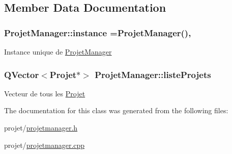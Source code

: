 \subsection{Member Data Documentation}
\hypertarget{class_projet_manager_a88d70fa1123219b8dbb749818a441afa}{}
\subsubsection[{instance}]{ Projet\+Manager\+::instance ={\bf Projet\+Manager}()\hspace{0.3cm}{\ttfamily [static]}, {\ttfamily [private]}}\label{class_projet_manager_a88d70fa1123219b8dbb749818a441afa}
Instance unique de \hyperlink{class_projet_manager}{Projet\+Manager} \hypertarget{class_projet_manager_a46c2e5dab1e538225fa022030e3a31d1}{}
\subsubsection[{liste\+Projets}]{\setlength{\rightskip}{0pt plus 5cm}Q\+Vector$<${\bf Projet}$\ast$$>$ Projet\+Manager\+::liste\+Projets\hspace{0.3cm}{\ttfamily [private]}}\label{class_projet_manager_a46c2e5dab1e538225fa022030e3a31d1}
Vecteur de tous les \hyperlink{class_projet}{Projet} 

The documentation for this class was generated from the following files\+:\begin{DoxyCompactItemize}
\item 
projet/\hyperlink{projetmanager_8h}{projetmanager.\+h}\item 
projet/\hyperlink{projetmanager_8cpp}{projetmanager.\+cpp}\end{DoxyCompactItemize}
